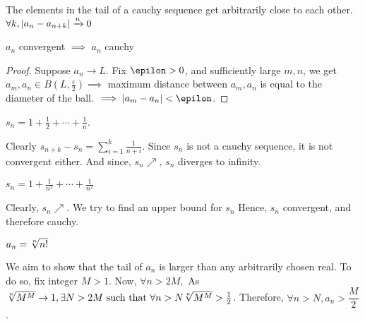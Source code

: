 \begin{definition}
\end{definition}
The elements in the tail of a cauchy sequence get arbitrarily close to each other. $\forall k,\abs{a_n - a_{n+k}}\xrightarrow{n}0$

\begin{proposition}
    $a_n$ convergent $\implies$ $a_n$ cauchy
\end{proposition}
\begin{proof}
    Suppose $a_n\to L$. Fix $\epilon > 0$, and sufficiently large $m,n$, we get $a_m,a_n\in B(L,\frac{\epsilon}{2})\implies$ maximum distance between $a_m,a_n$ is equal to the diameter of the ball. $\implies \abs{a_m-a_n}<\epilon$.
\end{proof}

\begin{example}
    $s_n = 1 + \frac{1}{2} +\dotsb+\frac{1}{n}$.
    
    Clearly $s_{n+k}-s_n = \sum_{i=1}^k\frac{1}{n+i}$.
    Since $s_n$ is not a cauchy sequence, it is not convergent either. And since, $s_n\nearrow$, $s_n$ diverges to infinity.
\end{example}

\begin{example}
    $s_n = 1 + \frac{1}{n^2} + \dotsb + \frac{1}{n^2}$
    
    Clearly, $s_n\nearrow.$ We try to find an upper bound for $s_n$
    Hence, $s_n$ convergent, and therefore cauchy.
\end{example}

\begin{example}
    $a_n = \sqrt[n]{n!}$
    
    We aim to show that the tail of $a_n$ is larger than any arbitrarily chosen real. To do so, fix integer $M>1$. Now, $\forall n>2M,$
    As $\sqrt[n]{M^M}\to1,\exists N>2M\text{ such that }\forall n>N\sqrt[n]{M^M}>\frac{1}{2}$. Therefore, $\forall n>N,a_n>\dfrac{M}{2}$.
\end{example}

